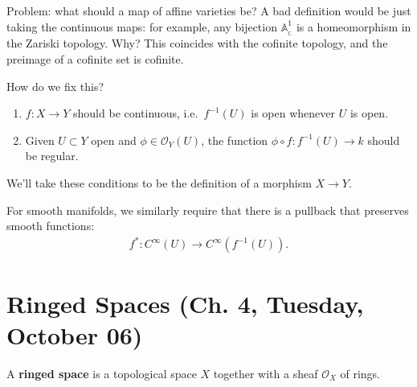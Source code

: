 Problem: what should a map of affine varieties be? A bad definition
would be just taking the continuous maps: for example, any bijection
\({\mathbb{A}}^1_{_{\mathbb{C}}}\) is a homeomorphism in the Zariski
topology. Why? This coincides with the cofinite topology, and the
preimage of a cofinite set is cofinite.

\begin{question}

How do we fix this?

\end{question}

\begin{answer}

\envlist

\begin{enumerate}
\def\labelenumi{\arabic{enumi}.}
\item
  \(f:X\to Y\) should be continuous, i.e.~\(f^{-1} (U)\) is open
  whenever \(U\) is open.
\item
  Given \(U\subset Y\) open and \(\phi \in {\mathcal{O}}_Y(U)\), the
  function \(\phi \circ f: f^{-1}(U) \to k\) should be regular.
\end{enumerate}

We'll take these conditions to be the definition of a morphism
\(X\to Y\).

\end{answer}

\begin{example}

For smooth manifolds, we similarly require that there is a pullback that
preserves smooth functions:
\begin{align*}  
f^*: C^\infty(U) \to C^\infty(f^{-1}(U))
.\end{align*}

\end{example}

\hypertarget{ringed-spaces-ch.-4-tuesday-october-06}{%
\section{Ringed Spaces (Ch. 4, Tuesday, October
06)}\label{ringed-spaces-ch.-4-tuesday-october-06}}

\begin{definition}

A \textbf{ringed space} is a topological space \(X\) together with a
sheaf \({\mathcal{O}}_X\) of rings.

\end{definition}

